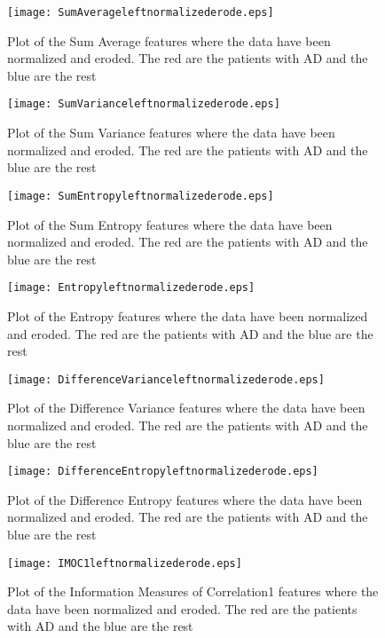 \begin{figure}[H]
  \centering
  \texttt{[image: SumAverageleftnormalizederode.eps]}
  \caption{Plot of the Sum Average features where the data have been normalized and eroded. The red are the patients with AD and the blue are the rest}\label{fig:SumAverageleftnormalizederode}
\end{figure}

\begin{figure}[H]
  \centering
  \texttt{[image: SumVarianceleftnormalizederode.eps]}
  \caption{Plot of the Sum Variance features where the data have been normalized and eroded. The red are the patients with AD and the blue are the rest}\label{fig:SumVarianceleftnormalizederode}
\end{figure}

\begin{figure}[H]
  \centering
  \texttt{[image: SumEntropyleftnormalizederode.eps]}
  \caption{Plot of the Sum Entropy features where the data have been normalized and eroded. The red are the patients with AD and the blue are the rest}\label{fig:SumEntropyleftnormalizederode}
\end{figure}

\begin{figure}[H]
  \centering
  \texttt{[image: Entropyleftnormalizederode.eps]}
  \caption{Plot of the Entropy features where the data have been normalized and eroded. The red are the patients with AD and the blue are the rest}\label{fig:Entropyleftnormalizederode}
\end{figure}

\begin{figure}[H]
  \centering
  \texttt{[image: DifferenceVarianceleftnormalizederode.eps]}
  \caption{Plot of the Difference Variance features where the data have been normalized and eroded. The red are the patients with AD and the blue are the rest}\label{fig:DifferenceVarianceleftnormalizederode}
\end{figure}

\begin{figure}[H]
  \centering
  \texttt{[image: DifferenceEntropyleftnormalizederode.eps]}
  \caption{Plot of the Difference Entropy features where the data have been normalized and eroded. The red are the patients with AD and the blue are the rest}\label{fig:DifferenceEntropyleftnormalizederode}
\end{figure}

\begin{figure}[H]
  \centering
  \texttt{[image: IMOC1leftnormalizederode.eps]}
  \caption{Plot of the Information Measures of Correlation1 features where the data have been normalized and eroded. The red are the patients with AD and the blue are the rest}\label{fig:IMOC1leftnormalizederode}
\end{figure}

